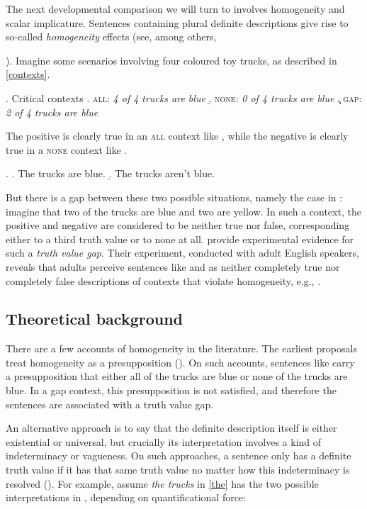 \documentclass[12pt, letterpaper]{article}
\begin{document}
The next developmental comparison we will turn to involves homogeneity and scalar implicature. Sentences containing plural definite descriptions give rise to so-called \textit{homogeneity} effects (see, among others, {\citealt*{Lobner:1987, Schwarzschild:1994, Breheny:2005, Gajewski:2005, Buring:2013, Spector:2013, Magri:2014}). Imagine some scenarios involving four coloured toy trucks, as described in \ref{contexts}. 

\ex. \label{contexts} Critical contexts
\a. \textsc{all:} \textit{4 of 4 trucks are blue}
\b. \textsc{none:} \textit{0 of 4 trucks are blue}
\c. \textsc{gap:} \textit{2 of 4 trucks are blue}

The positive \Next[a] is clearly true in an \textsc{all} context like \Last[a], while the negative \Next[b] is clearly true in a \textsc{none} context like \Last[b]. 

\ex. \label{the} \a. \label{thepos} The trucks are blue.
\b. \label{theneg} The trucks aren't blue.

But there is a gap between these two possible situations, namely the case in \LLast[c]: imagine that two of the trucks are blue and two are yellow. In such a context, the positive \Last[a] and negative \Last[b] are considered to be neither true nor false, corresponding either to a third truth value or to none at all. \cite{Kriz:2015} provide experimental evidence for such a \textit{truth value gap}. Their experiment, conducted with adult English speakers, reveals that adults perceive sentences like \Last[a] and \Last[b] as neither completely true nor completely false descriptions of contexts that violate homogeneity, e.g., \LLast[c]. 

\subsection{Theoretical background}

There are a few accounts of homogeneity in the literature. The earliest proposals treat homogeneity as a presupposition (\citealt{Schwarzschild:1994,Lobner:2000,Gajewski:2005}). On such accounts, sentences like \Last carry a presupposition that either all of the trucks are blue or none of the trucks are blue. In a gap context, this presupposition is not satisfied, and therefore the sentences are associated with a truth value gap.

An alternative approach is to say that the definite description itself is either existential or universal, but crucially its interpretation involves a kind of indeterminacy or vagueness. On such approaches, a sentence only has a definite truth value if it has that same truth value no matter how this indeterminacy is resolved (\citealt{Spector:2013, Kriz:2015a}). For example, assume \textit{the trucks} in \ref{the} has the two possible interpretations in \Next, depending on quantificational force: 

}
\end{document}
